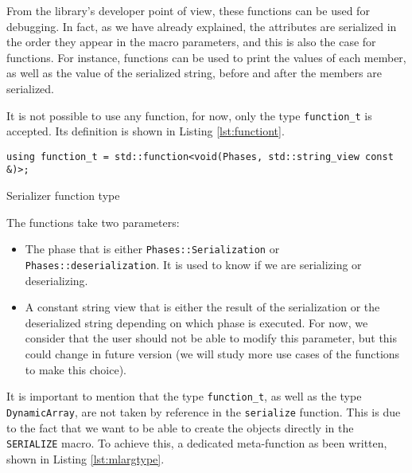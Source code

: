 From the library's developer point of view, these functions can be used for
debugging. In fact, as we have already explained, the attributes are serialized
in the order they appear in the macro parameters, and this is also the case for
functions. For instance, functions can be used to print the values of each
member, as well as the value of the serialized string, before and after the
members are serialized.

It is not possible to use any function, for now, only the type
\texttt{function\_t} is accepted. Its definition is shown in Listing
\ref{lst:functiont}.

\begin{listing}[ht!]
\begin{verbatim}
using function_t = std::function<void(Phases, std::string_view const &)>;
\end{verbatim}
\caption{Serializer function type}
\label{lst:functiont}
\end{listing}

The functions take two parameters:

\begin{itemize}
  \item The phase that is either \texttt{Phases::Serialization} or
    \texttt{Phases::deserialization}. It is used to know if we are serializing
    or deserializing.
  \item A constant string view that is either the result of the serialization or
    the deserialized string depending on which phase is executed. For now, we
    consider that the user should not be able to modify this parameter, but this
    could change in future version (we will study more use cases of the
    functions to make this choice).
\end{itemize}

It is important to mention that the type \texttt{function\_t}, as well as the
type \texttt{DynamicArray}, are not taken by reference in the \texttt{serialize}
function. This is due to the fact that we want to be able to create the objects
directly in the \texttt{SERIALIZE} macro. To achieve this, a dedicated
meta-function as been written, shown in Listing \ref{lst:mlargtype}.

